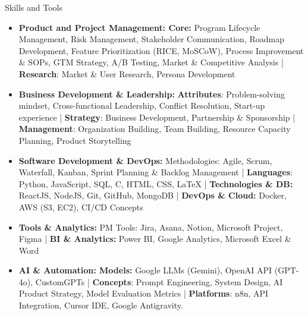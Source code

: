 \documentclass{resume} %
\begin{document}
\begin{rSection}{Skills and Tools}

\begin{itemize}[left=-1.5em, labelsep=.1cm, labelwidth=.2cm, itemsep=0.0em]
    \item \textbf{Product and Project Management: Core: }Program Lifecycle Management, Risk Management, Stakeholder Communication, Roadmap Development, Feature Prioritization (RICE, MoSCoW), Process Improvement \& SOPs, GTM Strategy, A/B Testing, Market \& Competitive Analysis | \textbf{Research}: Market \& User Research, Persona Development
    \item \textbf{Business Development \& Leadership:} \textbf{Attributes}: Problem-solving mindset, Cross-functional Leadership, Conflict Resolution, Start-up experience | \textbf{Strategy}: Business Development, Partnership \& Sponsorship | \textbf{Management}: Organization Building, Team Building, Resource Capacity Planning, Product Storytelling
    \item \textbf{Software Development \& DevOps:} Methodologies: Agile, Scrum, Waterfall, Kanban, Sprint Planning \& Backlog Management | \textbf{Languages}: Python, JavaScript, SQL, C, HTML, CSS, LaTeX | \textbf{Technologies \& DB:} ReactJS, NodeJS, Git, GitHub, MongoDB | \textbf{DevOps \& Cloud:} Docker, AWS (S3, EC2), CI/CD Concepts
      \item \textbf{Tools \& Analytics:} PM Tools: Jira, Asana, Notion, Microsoft Project, Figma | \textbf{BI \& Analytics:} Power BI, Google Analytics, Microsoft Excel \& Word 
    \item \textbf{AI \& Automation: Models:} Google LLMs (Gemini), OpenAI API (GPT-4o), CustomGPTs | \textbf{Concepts}: Prompt Engineering, System Design, AI Product Strategy, Model Evaluation Metrics | \textbf{Platforms}: n8n, API Integration, Cursor IDE, Google Antigravity.

    
\end{itemize}

\end{rSection}
\end{document}

